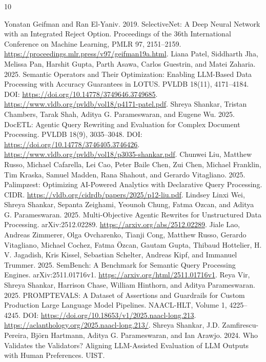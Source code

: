 \documentclass[11pt]{article}
\begin{document}
\begin{thebibliography}{10}
\raggedright
{} Yonatan Geifman and Ran El-Yaniv. 2019.
SelectiveNet: A Deep Neural Network with an Integrated Reject Option.
Proceedings of the 36th International Conference on Machine Learning,
PMLR 97, 2151--2159.
\url{https://proceedings.mlr.press/v97/geifman19a.html}.
 Liana Patel, Siddharth Jha, Melissa Pan, Harshit Gupta, Parth Asawa, Carlos Guestrin, and Matei Zaharia. 2025. Semantic Operators and Their Optimization: Enabling LLM-Based
Data Processing with Accuracy Guarantees in LOTUS. PVLDB 18(11), 4171--4184. DOI: \url{https://doi.org/10.14778/3749646.3749685}.
\url{https://www.vldb.org/pvldb/vol18/p4171-patel.pdf}.
 Shreya Shankar, Tristan Chambers, Tarak Shah, Aditya G. Parameswaran, and Eugene Wu. 2025. DocETL: Agentic Query Rewriting and Evaluation for Complex
Document Processing. PVLDB 18(9), 3035--3048. DOI: \url{https://doi.org/10.14778/3746405.3746426}.
\url{https://www.vldb.org/pvldb/vol18/p3035-shankar.pdf}.
 Chunwei Liu, Matthew Russo, Michael Cafarella, Lei Cao, Peter Baile Chen, Zui Chen, Michael Franklin, Tim Kraska, Samuel Madden, Rana Shahout, and Gerardo Vitagliano. 2025. Palimpzest: Optimizing AI-Powered Analytics with Declarative
Query Processing. CIDR.
\url{https://vldb.org/cidrdb/papers/2025/p12-liu.pdf}.
 Lindsey Linxi Wei, Shreya Shankar, Sepanta Zeighami, Yeounoh Chung, Fatma Ozcan, and Aditya G. Parameswaran. 2025. Multi-Objective Agentic Rewrites for Unstructured Data Processing.
arXiv:2512.02289.
\url{https://arxiv.org/abs/2512.02289}.
 Jiale Lao, Andreas Zimmerer, Olga Ovcharenko, Tianji Cong, Matthew Russo, Gerardo Vitagliano, Michael Cochez, Fatma \"Ozcan, Gautam Gupta, Thibaud Hottelier, H. V. Jagadish, Kris Kissel, Sebastian Schelter, Andreas Kipf, and Immanuel Trummer. 2025. SemBench: A Benchmark for Semantic Query Processing Engines.
arXiv:2511.01716v1.
\url{https://arxiv.org/html/2511.01716v1}.
 Reya Vir, Shreya Shankar, Harrison Chase, William Hinthorn, and Aditya Parameswaran. 2025. PROMPTEVALS: A Dataset of Assertions and Guardrails for
Custom Production Large Language Model Pipelines. NAACL-HLT, Volume 1, 4225--4245. DOI: \url{https://doi.org/10.18653/v1/2025.naacl-long.213}.
\url{https://aclanthology.org/2025.naacl-long.213/}.
 Shreya Shankar, J.D. Zamfirescu-Pereira, Bj\"orn Hartmann, Aditya G. Parameswaran, and Ian Arawjo. 2024. Who Validates the Validators? Aligning LLM-Assisted Evaluation
of LLM Outputs with Human Preferences. UIST.

\end{thebibliography}
\end{document}
